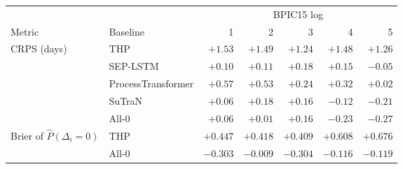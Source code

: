 \begin{tabular}{llrrrrr}\toprule
 & & \multicolumn{5}{c}{BPIC15 log}\\\cmidrule(lr){3-7}
Metric & Baseline & 1 & 2 & 3 & 4 & 5\\\midrule
CRPS (days) & THP & $\mathbf{+1.53}$ & $\mathbf{+1.49}$ & $\mathbf{+1.24}$ & $\mathbf{+1.48}$ & $\mathbf{+1.26}$\\
 & SEP-LSTM & $\mathbf{+0.10}$ & $\mathbf{+0.11}$ & $\mathbf{+0.18}$ & $+0.15$ & $-0.05$\\
 & ProcessTransformer & $\mathbf{+0.57}$ & $\mathbf{+0.53}$ & $\mathbf{+0.24}$ & $+0.32$ & $+0.02$\\
 & SuTraN & $\mathbf{+0.06}$ & $\mathbf{+0.18}$ & $\mathbf{+0.16}$ & $-0.12$ & $\mathit{-0.21}$\\
 & All-0 & $\mathbf{+0.06}$ & $+0.01$ & $\mathbf{+0.16}$ & $-0.23$ & $\mathit{-0.27}$\\
\midrule
Brier of $\hat P(\Delta_i=0)$ & THP & $\mathbf{+0.447}$ & $\mathbf{+0.418}$ & $\mathbf{+0.409}$ & $\mathbf{+0.608}$ & $\mathbf{+0.676}$\\
 & All-0 & $\mathit{-0.303}$ & $-0.009$ & $\mathit{-0.304}$ & $\mathit{-0.116}$ & $\mathit{-0.119}$\\
\bottomrule
\end{tabular}
